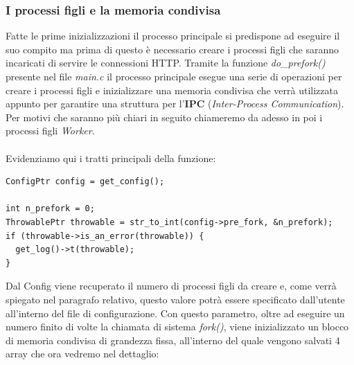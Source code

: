 \documentclass[italian]{tktltiki2}
\begin{document}
\subsubsection{I processi figli e la memoria condivisa}
\label{ssec:child_process}

Fatte le prime inizializzazioni il processo principale si predispone ad eseguire il suo compito ma prima di questo è necessario creare i processi figli che saranno incaricati di servire le connessioni HTTP. Tramite la funzione \emph{do\_prefork()} presente nel file \emph{main.c} il processo principale esegue una serie di operazioni per creare i processi figli e inizializzare una memoria condivisa che verrà utilizzata appunto per garantire una struttura per l'\textbf{IPC} (\emph{Inter-Process Communication}). Per motivi che saranno più chiari in seguito chiameremo da adesso in poi i processi figli \emph{Worker}. \\\\Evidenziamo qui i tratti principali della funzione:
\begin{lstlisting}
ConfigPtr config = get_config();

int n_prefork = 0;
ThrowablePtr throwable = str_to_int(config->pre_fork, &n_prefork);
if (throwable->is_an_error(throwable)) {
  get_log()->t(throwable);
}
\end{lstlisting}
Dal Config viene recuperato il numero di processi figli da creare e, come verrà spiegato nel paragrafo relativo, questo valore potrà essere specificato dall'utente all'interno del file di configurazione. Con questo parametro, oltre ad eseguire un numero finito di volte la chiamata di sistema \emph{fork()}, viene inizializzato un blocco di memoria condivisa di grandezza fissa, all'interno del quale vengono salvati 4 array che ora vedremo nel dettaglio:
\end{document}

